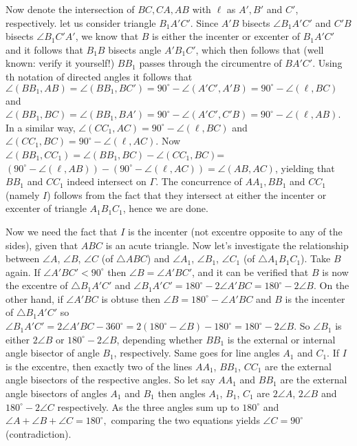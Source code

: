\documentclass[11pt,a4paper]{article}
\begin{document}
\begin{enumerate}
Now denote the intersection of $BC, CA, AB$ with $\ell$ as $A',B'$ and $C'$, respectively. let us consider triangle $B_1A'C'$. Since $A'B$ bisects $\angle B_1A'C'$ and $C'B$ bisects $\angle B_1C'A'$, we know that $B$ is either the incenter or excenter of $B_1A'C'$ and it follows that $B_1B$ bisects angle $A'B_1C'$, which then follows that (well known: verify it yourself!) $BB_1$ passes through the circumentre of $BA'C'$. Using th notation of directed angles it follows that $\angle (BB_1,AB)=\angle (BB_1,BC')=90^{\circ}-\angle (A'C',A'B)=90^{\circ}-\angle (\ell, BC)$ and $\angle (BB_1,BC)=\angle (BB_1,BA')=90^{\circ}-\angle (A'C',C'B)=90^{\circ}-\angle (\ell,AB)$. In a similar way, $\angle (CC_1,AC)=90^{\circ}-\angle (\ell, BC)$ and $\angle (CC_1,BC)=90^{\circ}-\angle (\ell, AC).$ Now $\angle (BB_1,CC_1)=\angle (BB_1, BC)-\angle (CC_1, BC)$=$(90^{\circ}-\angle (\ell,AB))-(90^{\circ}-\angle (\ell,AC))=\angle (AB, AC)$, yielding that $BB_1$ and $CC_1$ indeed intersect on $\Gamma$. The concurrence of $AA_1, BB_1$ and $CC_1$ (namely $I$) follows from the fact that they intersect at either the incenter or excenter of triangle $A_1B_1C_1$, hence we are done.

Now we need the fact that $I$ is the incenter (not excentre opposite to any of the sides), given that $ABC$ is an acute triangle. Now let's investigate the relationship between $\angle A$, $\angle B$, $\angle C$ (of $\triangle ABC$) and $\angle A_1$, $\angle B_1$, $\angle C_1$ (of $\triangle A_1B_1C_1$). Take $B$ again. If $\angle A'BC'<90^{\circ}$ then $\angle B=\angle A'BC'$, and it can be verified that $B$ is now the excentre of $\triangle B_1A'C'$ and $\angle B_1A'C'=180^{\circ}-2\angle A'BC=180^{\circ}-2\angle B$. On the other hand, if $\angle A'BC$ is obtuse then $\angle B=180^{\circ}-\angle A'BC$ and $B$ is the incenter of $\triangle B_1A'C'$ so $\angle B_1A'C'=2\angle A'BC-360^{\circ}=2(180^{\circ}-\angle B)-180^{\circ}=180^{\circ}-2\angle B.$ So $\angle B_1$ is either $2\angle B$ or $180^{\circ}-2\angle B$, depending whether $BB_1$ is the external or internal angle bisector of angle $B_1$, respectively. Same goes for line angles $A_1$ and $C_1$. If $I$ is the excentre, then exactly two of the lines $AA_1$, $BB_1$, $CC_1$ are the external angle bisectors of the respective angles. So let say $AA_1$ and $BB_1$ are the external angle bisectors of angles $A_1$ and $B_1$ then angles $A_1$, $B_1$, $C_1$ are $2\angle A$, $2\angle B$ and $180^{\circ}-2\angle C$ respectively. As the three angles sum up to $180^{\circ}$ and $\angle A+\angle B+\angle C=180^{\circ},$ comparing the two equations yields $\angle C=90^{\circ}$ (contradiction).


\end{enumerate}
\end{document}
